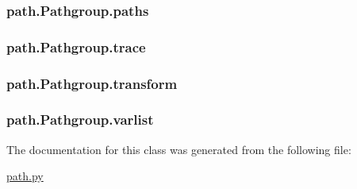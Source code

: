 \subsubsection[{paths}]{\setlength{\rightskip}{0pt plus 5cm}path.\+Pathgroup.\+paths}\label{classpath_1_1_pathgroup_aebd1cee80f2cbaf72fc59245399eac6e}
\hypertarget{classpath_1_1_pathgroup_a4befbf72ed268a57ace2247f44e96d74}{}
\subsubsection[{trace}]{\setlength{\rightskip}{0pt plus 5cm}path.\+Pathgroup.\+trace}\label{classpath_1_1_pathgroup_a4befbf72ed268a57ace2247f44e96d74}
\hypertarget{classpath_1_1_pathgroup_ab5f832d2785df23e41e7c9121885a002}{}
\subsubsection[{transform}]{\setlength{\rightskip}{0pt plus 5cm}path.\+Pathgroup.\+transform}\label{classpath_1_1_pathgroup_ab5f832d2785df23e41e7c9121885a002}
\hypertarget{classpath_1_1_pathgroup_a506c871ab4905e489a907c64f936f4e8}{}
\subsubsection[{varlist}]{\setlength{\rightskip}{0pt plus 5cm}path.\+Pathgroup.\+varlist}\label{classpath_1_1_pathgroup_a506c871ab4905e489a907c64f936f4e8}


The documentation for this class was generated from the following file\+:\begin{DoxyCompactItemize}
\item 
\hyperlink{path_8py}{path.\+py}\end{DoxyCompactItemize}
